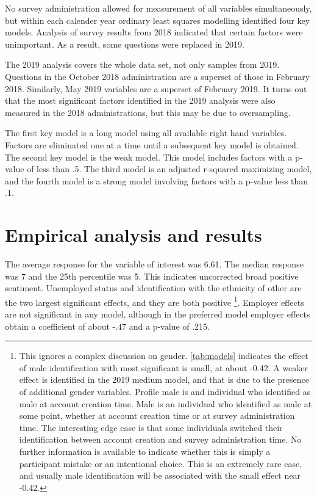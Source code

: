 \documentclass[AER]{./aea-latex-templates/AEA}
\begin{document}
        No survey administration allowed for measurement of all variables simultaneously,
        but within each calender year ordinary least squares modelling identified four key models.
        Analysis of survey results from 2018 indicated that certain factors were unimportant.
        As a result, some questions were replaced in 2019.

        The 2019 analysis covers the whole data set, not only samples from 2019.
        Questions in the October 2018 administration are a superset of those in February 2018.
        Similarly, May 2019 variables are a superset of February 2019.
        It turns out that the most significant factors identified in the
        2019 analysis were also measured in the 2018 administrations, but this may be due to oversampling.
        
        The first key model is a long model using all available right hand variables.
        Factors are eliminated one at a time until a subsequent key model is obtained.
        The second key model is the weak model. This model includes factors with a p-value of less than .5.
        The third model is an adjusted r-squared maximizing model, and the fourth
        model is a strong model involving factors with a p-value less than .1.

        \section{Empirical analysis and results}

        The average response for the variable of interest was 6.61.
        The median response was 7 and the 25th percentile was 5.
        This indicates uncorrected broad positive sentiment.
        Unemployed status and identification with the ethnicity of
        other are the two largest significant effects, and they are both positive
        \footnote{
            This ignores a complex discussion on gender. 
            \ref{tab:models} indicates the effect of male
            identification with most significant is small, at about -0.42.
            A weaker effect is identified in the 2019 medium model, and that is
            due to the presence of additional gender variables. Profile male is
            and individual who identified as male at account creation time.
            Male is an individual who identified as male at some point, whether at
            account creation time or at survey administration time. The interesting
            edge case is that some individuals switched their identification between
            account creation and survey administration time. No further information
            is available to indicate whether this is simply a participant mistake
            or an intentional choice. This is an extremely rare case, and usually
            male identification will be associated with the small effect near -0.42.
        }.
        Employer effects are not significant in any model, although in the preferred
        model employer effects obtain a coefficient of about -.47 and a p-value of .215.
\end{document}
